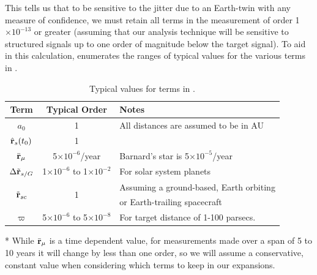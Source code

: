 This tells us that to be sensitive to the jitter due to an Earth-twin with any measure of confidence, we must retain all terms in the measurement of order 1$\times10^{-13}$ or greater (assuming that our analysis technique will be sensitive to structured signals up to one order of magnitude below the target signal).  To aid in this calculation,  enumerates the ranges of typical values for the various terms in .
\begin{table}[ht]
\caption[Typical values of terms in astrometric observation equation]{Typical values for terms in .\label{tbl:typ_vals}}
\begin{center}
\begin{threeparttable}[b]
\begin{tabular}{ c c l}
\hline\hline
Term & Typical Order & Notes \\
\hline
$a_0$ & 1 & All distances are assumed to be in AU\\
$\hat{\mathbf{r}}_s(t_0)$ & 1 &\\
$\bar{\mathbf{r}}_\mu$\tnote{*} & 5$\times10^{-6}$/year & Barnard's star is 5$\times10^{-5}$/year \\
$\Delta \tilde{\mathbf{r}}_{s/G}$ & 1$\times10^{-6}$ to 1$\times10^{-2}$ & For solar system planets \\
\multirow{2}{*}{$ \tilde{\mathbf{r}}_{sc}$} & \multirow{2}{*}{1} & Assuming a ground-based, Earth orbiting\\
& & or Earth-trailing spacecraft\\
$\varpi $& 5$\times10^{-6}$ to 5$\times10^{-8}$ & For target distance of 1-100 parsecs.\\
\hline
\end{tabular}
\begin{tablenotes}
\item[*]While $\bar{\mathbf{r}}_\mu$ is a time dependent value, for measurements made over a span of 5 to 10 years it will change by less than one order, so we will assume a conservative, constant value when considering which terms to keep in our expansions.
\end{tablenotes}
\end{threeparttable}
\end{center}
\end{table}

